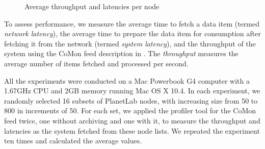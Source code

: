 \begin{figure}[t]
\begin{center}
\caption{Average throughput and latencies per node}
\label{fig:throughput}
\end{center}
\end{figure}

To assess performance, we measure 
the average time to fetch a data item (termed {\em network latency}), 
the average time to prepare the data item for consumption
after fetching it from the network (termed {\em system latency}),
and the throughput of the system using the CoMon feed
description in . 
The {\em throughput} measures the average
number of items fetched and processed per second. 

All the experiments were conducted on a Mac Powerbook G4 computer
with a 1.67GHz CPU and 2GB memory running Mac OS X 10.4.
In each experiment, we randomly selected 16 subsets of PlanetLab
nodes, with increasing size from 50 to 800 in increments of 50.
For each set, we applied the profiler tool for the CoMon feed
twice, one without archiving and one with it, to measure the
throughput and latencies as the system fetched from these node lists. 
We repeated the experiment ten times and calculated the average values.

